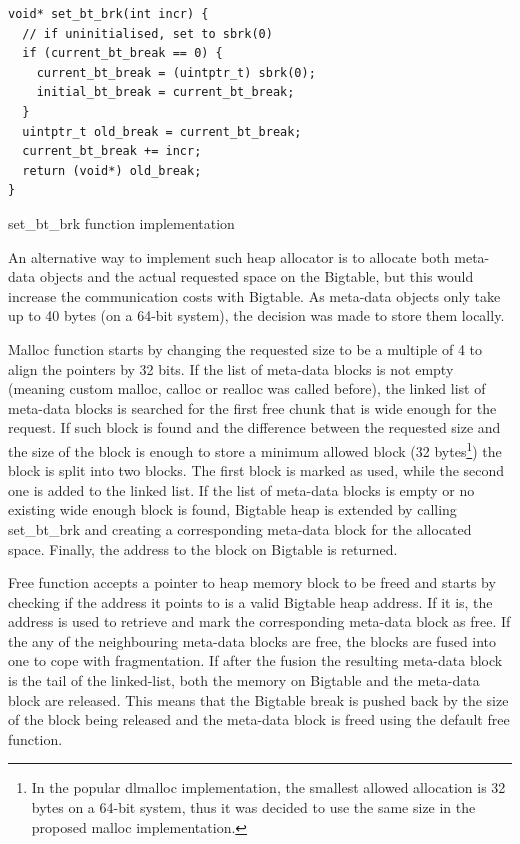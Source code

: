 \documentclass[bsc,frontabs,twoside,singlespacing,parskip,deptreport]{infthesis}     %
\begin{document}
\begin{listing}
\begin{verbatim}
void* set_bt_brk(int incr) {
  // if uninitialised, set to sbrk(0)
  if (current_bt_break == 0) {
    current_bt_break = (uintptr_t) sbrk(0);
    initial_bt_break = current_bt_break;
  }
  uintptr_t old_break = current_bt_break;
  current_bt_break += incr;
  return (void*) old_break;
}
\end{verbatim}
\caption{set\_bt\_brk function implementation}
\label{setbtbrk}
\end{listing}

An alternative way to implement such heap allocator is to allocate both meta-data objects and the actual requested space on the Bigtable, but this would increase the communication costs with Bigtable. As meta-data objects only take up to 40 bytes (on a 64-bit system), the decision was made to store them locally.

Malloc function starts by changing the requested size to be a multiple of 4 to align the pointers by 32 bits. If the list of meta-data blocks is not empty (meaning custom malloc, calloc or realloc was called before), the linked list of meta-data blocks is searched for the first free chunk that is wide enough for the request. If such block is found and the difference between the requested size and the size of the block is enough to store a minimum allowed block (32 bytes\footnote{In the popular dlmalloc \citep{leadlmalloc} implementation, the smallest allowed allocation is 32 bytes on a 64-bit system, thus it was decided to use the same size in the proposed malloc implementation.}) the block is split into two blocks. The first block is marked as used, while the second one is added to the linked list. If the list of meta-data blocks is empty or no existing wide enough block is found, Bigtable heap is extended by calling set\_bt\_brk and creating a corresponding meta-data block for the allocated space. Finally, the address to the block on Bigtable is returned.

Free function accepts a pointer to heap memory block to be freed and starts by checking if the address it points to is a valid Bigtable heap address. If it is, the address is used to retrieve and mark the corresponding meta-data block as free. If the any of the neighbouring meta-data blocks are free, the blocks are fused into one to cope with fragmentation. If after the fusion the resulting meta-data block is the tail of the linked-list, both the memory on Bigtable and the meta-data block are released. This means that the Bigtable break is pushed back by the size of the block being released and the meta-data block is freed using the default free function.
\end{document}
